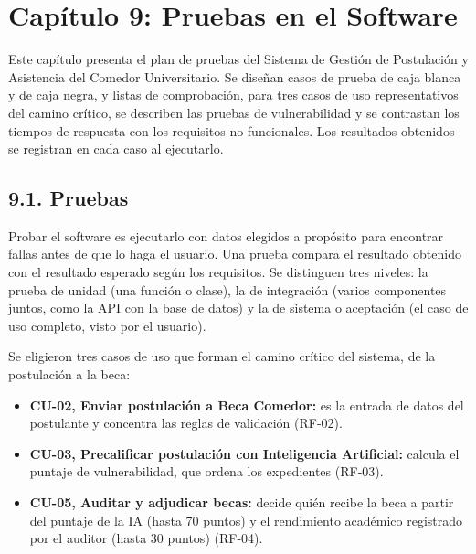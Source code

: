 
\newpage
\section{Capítulo 9: Pruebas en el Software}\label{cap:pruebas}


Este capítulo presenta el plan de pruebas del Sistema de Gestión de Postulación y Asistencia del Comedor Universitario. Se diseñan casos de prueba de caja blanca y de caja negra, y listas de comprobación, para tres casos de uso representativos del camino crítico, se describen las pruebas de vulnerabilidad y se contrastan los tiempos de respuesta con los requisitos no funcionales. Los resultados obtenidos se registran en cada caso al ejecutarlo.

\subsection{9.1. Pruebas}

Probar el software es ejecutarlo con datos elegidos a propósito para encontrar fallas antes de que lo haga el usuario. Una prueba compara el resultado obtenido con el resultado esperado según los requisitos. Se distinguen tres niveles: la prueba de unidad (una función o clase), la de integración (varios componentes juntos, como la API con la base de datos) y la de sistema o aceptación (el caso de uso completo, visto por el usuario).

Se eligieron tres casos de uso que forman el camino crítico del sistema, de la postulación a la beca:

\begin{itemize}
    \item \textbf{CU-02, Enviar postulación a Beca Comedor:} es la entrada de datos del postulante y concentra las reglas de validación (RF-02).
    \item \textbf{CU-03, Precalificar postulación con Inteligencia Artificial:} calcula el puntaje de vulnerabilidad, que ordena los expedientes (RF-03).
    \item \textbf{CU-05, Auditar y adjudicar becas:} decide quién recibe la beca a partir del puntaje de la IA (hasta 70 puntos) y el rendimiento académico registrado por el auditor (hasta 30 puntos) (RF-04).
\end{itemize}


